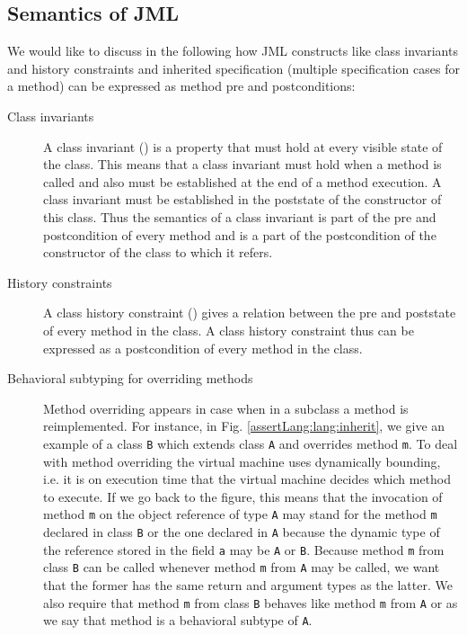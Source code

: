 \subsection{Semantics of JML} \label{javaVerif:JMLsemantics}


We would like to discuss in the following how JML constructs like class invariants and history constraints and inherited specification
(multiple specification cases for a method) can be expressed as 
method pre and postconditions:

\begin{description} 
  \item [Class invariants] A class invariant (\ClassInv)  is a property that must hold at every visible state of the class. This means that a
        class invariant must hold when a method is called and also must be established at the end of a method execution. 
	A class invariant must be established in the poststate 
	of the constructor of this class.
	Thus the semantics of
	a class invariant is part of the pre and  postcondition of every method and is a part of the postcondition of the constructor of
	the class to which it refers.
	
        
  \item [History constraints] A class history constraint (\ClassHistoryConstr) gives a relation between the pre and poststate of every method in the class. 
        A class history constraint thus can be expressed as a postcondition of every method in the class.
        
  \item [Behavioral subtyping for overriding methods]
        Method overriding appears in case when in a subclass a method is reimplemented.  For instance, in Fig. \ref{assertLang:lang:inherit},
	we give an example of a class \lstinline!B! which extends class   \lstinline!A! and overrides method  \lstinline!m!. 
	To deal with method overriding the virtual machine uses dynamically bounding, i.e. it is on execution time that the virtual machine decides which method to execute.
	If we go back to the figure, this means that the invocation of method   \lstinline!m! on the object reference of type \lstinline!A!
        may stand for the method  \lstinline!m! declared in class \lstinline!B! or the one declared in \lstinline!A! because the dynamic type of the
	reference stored in the field  \lstinline!a! may be \lstinline!A! or \lstinline!B!. Because  method \lstinline!m! from
        class \lstinline!B! can be called whenever method  \lstinline!m! from  \lstinline!A! may be called, we want that the former has the same 
	return and argument types as the latter. We also require that method \lstinline!m! from
        class \lstinline!B! behaves like method \lstinline!m! from \lstinline!A! or as we say that method is a behavioral subtype of \lstinline!A!. 
	

\end{description}
